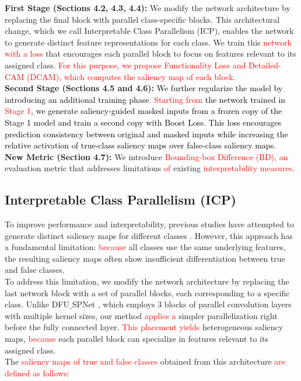 \documentclass[preprint,7pt, a4paper]{elsarticle}
\begin{document}
\textbf{First Stage (Sections 4.2, 4.3, 4.4):} We modify the network architecture by replacing the final block with parallel class-specific blocks. This architectural change, which we call Interpretable Class Parallelism (ICP), enables the network to generate distinct feature representations for each class. We train this \textcolor{red}{network with a loss} that encourages each parallel block to focus on features relevant to its assigned class. \textcolor{red}{For this purpose, we propose Functionality Loss and Detailed-CAM (DCAM), which computes the saliency map of each block.}\\
\indent \textbf{Second Stage (Sections 4.5 and 4.6):} \textcolor{black}{We further regularize the model by introducing an additional training phase. \textcolor{red}{Starting from} the network trained in \textcolor{red}{Stage 1}, we generate saliency-guided masked inputs from a frozen copy of the Stage 1 model and train a second copy with Boost Loss. This loss encourages prediction consistency between original and masked inputs while increasing the relative activation of true-class saliency maps over false-class saliency maps.}\\
\indent \textbf{New Metric (Section 4.7):} We introduce \textcolor{red}{Bounding-box Difference (BD),} \textcolor{red}{an} evaluation metric that addresses limitations \textcolor{red}{of} existing \textcolor{red}{interpretability measures}.


\subsection{Interpretable Class Parallelism (ICP)}
\label{m1}

To improve performance and interpretability, previous studies have attempted to generate distinct saliency maps for different classes \cite{1, 4, 7}. However, this approach has a fundamental limitation: \textcolor{red}{because} all classes use the same underlying features, the resulting saliency maps often show insufficient differentiation between true and false classes.\\
\indent To address this limitation, we modify the network architecture by replacing the last network block with a set of parallel blocks, each corresponding to a specific class. Unlike DFU$\_$SPNet \cite{43}, which employs 3 blocks of parallel convolution layers with multiple kernel sizes, our method \textcolor{red}{applies a} simpler parallelization right before the fully connected layer. \textcolor{red}{This placement yields} heterogeneous saliency maps, \textcolor{red}{because} each parallel block can specialize in features relevant to its assigned class.\\
\indent The \textcolor{red}{saliency maps of true and false classes} obtained from this architecture \textcolor{red}{are defined as follows}:
\end{document}
